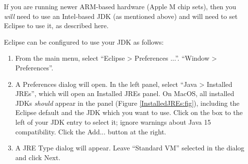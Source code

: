 \ifMacOS
\begin{sideblock}
If you are running newer ARM-based hardware (Apple M chip sets), then
you {\it will} need to use an
Intel-based JDK (as mentioned above) and will need to set Eclipse to
use it, as described here.
\end{sideblock}
\fi

Eclipse can be configured to use your JDK as follows:

\begin{enumerate}

\item From the main menu, select 
\ifMacOS
``{\sf Eclipse > Preferences ...}''.
\else
``{\sf Window > Preferences}''.
\fi

\item A {\sf Preferences} dialog will open. In the left panel, select
``{\sf Java > Installed JREs}'', which will open an {\sf Installed JREs}
panel.
\ifMacOS %
On MacOS, all installed JDKs {\it should} appear in the panel
(Figure \ref{InstalledJREs:fig}), including the Eclipse default and
the JDK which you want to use.  Click on the box to the left of
your JDK entry to select it; ignore warnings about Java 15
compatibility.
\else  %
Click the {\sf Add...} button at the right.

\item A {\sf JRE Type} dialog will appear. Leave ``Standard VM''
selected in the dialog and click {\sf Next}.


\end{enumerate}
